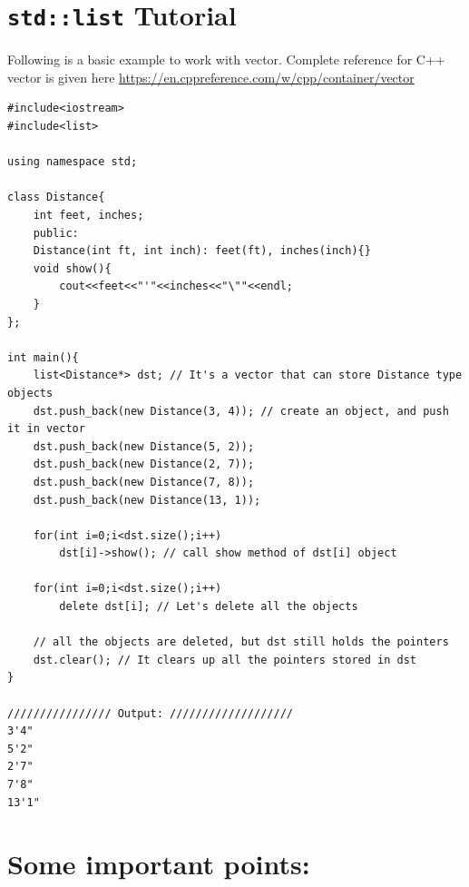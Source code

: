 \documentclass[a4paper,12pt]{article}
\begin{document}
	\section{\texttt{std::list} Tutorial}
	
	Following is a basic example to work with vector. Complete reference for C++ vector is given here \url{https://en.cppreference.com/w/cpp/container/vector}
	\begin{lstlisting}
#include<iostream>
#include<list>

using namespace std;

class Distance{
	int feet, inches;
	public:
	Distance(int ft, int inch): feet(ft), inches(inch){}
	void show(){
		cout<<feet<<"'"<<inches<<"\""<<endl;
	}
};

int main(){
	list<Distance*> dst; // It's a vector that can store Distance type objects
	dst.push_back(new Distance(3, 4)); // create an object, and push it in vector
	dst.push_back(new Distance(5, 2));
	dst.push_back(new Distance(2, 7));
	dst.push_back(new Distance(7, 8));
	dst.push_back(new Distance(13, 1));
	
	for(int i=0;i<dst.size();i++)
		dst[i]->show(); // call show method of dst[i] object
		
	for(int i=0;i<dst.size();i++)
		delete dst[i]; // Let's delete all the objects
		
	// all the objects are deleted, but dst still holds the pointers	
	dst.clear(); // It clears up all the pointers stored in dst
}

//////////////// Output: ///////////////////
3'4"
5'2"
2'7"
7'8"
13'1"
	\end{lstlisting}
	
	\section{Some important points:} 
	
\end{document}
